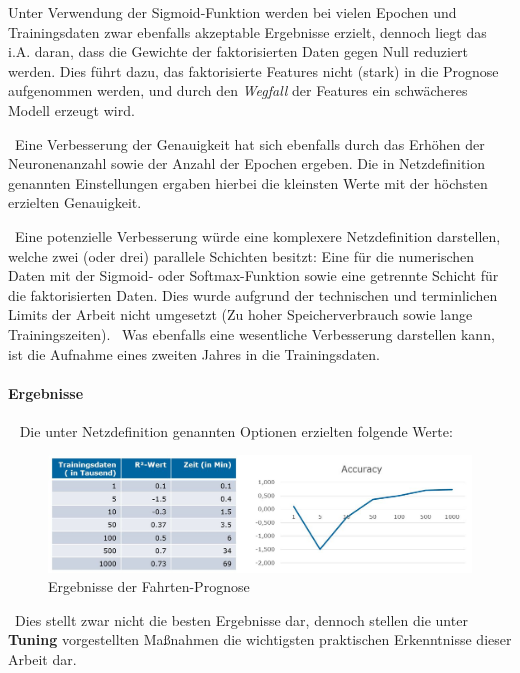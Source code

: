 Unter Verwendung der Sigmoid-Funktion werden bei vielen Epochen und Trainingsdaten zwar ebenfalls akzeptable Ergebnisse erzielt, dennoch liegt das i.A. daran, dass die Gewichte der faktorisierten Daten gegen Null reduziert werden. Dies führt dazu, das faktorisierte Features nicht (stark) in die Prognose aufgenommen werden, und durch den \textit{Wegfall} der Features ein schwächeres Modell erzeugt wird. 

~\newline Eine Verbesserung der Genauigkeit hat sich ebenfalls durch das Erhöhen der Neuronenanzahl sowie der Anzahl der Epochen ergeben. Die in Netzdefinition genannten Einstellungen ergaben hierbei die kleinsten Werte mit der höchsten erzielten Genauigkeit.

~\newline Eine potenzielle Verbesserung würde eine komplexere Netzdefinition darstellen, welche zwei (oder drei) parallele Schichten besitzt: Eine für die numerischen Daten mit der Sigmoid- oder Softmax-Funktion sowie eine getrennte Schicht für die faktorisierten Daten. Dies wurde aufgrund der technischen und terminlichen Limits der Arbeit nicht umgesetzt (Zu hoher Speicherverbrauch sowie lange Trainingszeiten). 
~\newline Was ebenfalls eine wesentliche Verbesserung darstellen kann, ist die Aufnahme eines zweiten Jahres in die Trainingsdaten. ~\newpage
\paragraph{Ergebnisse} ~\newline
Die unter Netzdefinition genannten Optionen erzielten folgende Werte:

\begin{figure}[h]
	\begin{center}
		\includegraphics[width=0.95\linewidth]{Bilder/FahrtenErgebnisse}
		\caption[Ergebnisse der Trinkgeldprognose]{Ergebnisse der Fahrten-Prognose}
		\label{fig:RidesErg}
	\end{center}
\end{figure}

~\newline Dies stellt zwar nicht die besten Ergebnisse dar, dennoch stellen die unter \textbf{Tuning} vorgestellten Maßnahmen die wichtigsten praktischen Erkenntnisse dieser Arbeit dar. 

